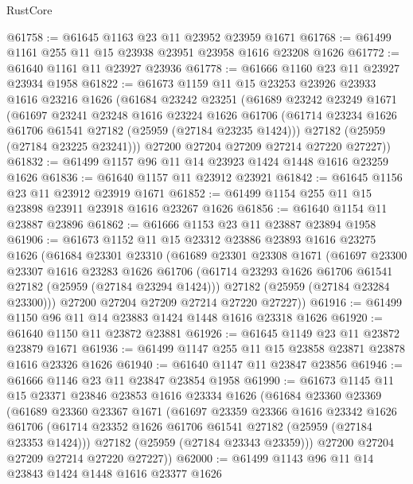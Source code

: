 \begin{lexlean}{RustCore}
\begin{coremodule}
@61758 := @61645 @1163 @23 @11 @23952 @23959 @1671
@61768 := @61499 @1161 @255 @11 @15 @23938 @23951 @23958 @1616 @23208 @1626
@61772 := @61640 @1161 @11 @23927 @23936
@61778 := @61666 @1160 @23 @11 @23927 @23934 @1958
@61822 := @61673
    @1159
    @11
    @15
    @23253
    @23926
    @23933
    @1616
    @23216
    @1626
    (@61684
      @23242
      @23251
      (@61689
        @23242
        @23249
        @1671
        (@61697
          @23241
          @23248
          @1616
          @23224
          @1626
          @61706
          (@61714 @23234 @1626 @61706 @61541 @27182 (@25959 (@27184 @23235 @1424)))
          @27182
          (@25959 (@27184 @23225 @23241)))
        @27200
        @27204
        @27209
        @27214
        @27220
        @27227))
@61832 := @61499 @1157 @96 @11 @14 @23923 @1424 @1448 @1616 @23259 @1626
@61836 := @61640 @1157 @11 @23912 @23921
@61842 := @61645 @1156 @23 @11 @23912 @23919 @1671
@61852 := @61499 @1154 @255 @11 @15 @23898 @23911 @23918 @1616 @23267 @1626
@61856 := @61640 @1154 @11 @23887 @23896
@61862 := @61666 @1153 @23 @11 @23887 @23894 @1958
@61906 := @61673
    @1152
    @11
    @15
    @23312
    @23886
    @23893
    @1616
    @23275
    @1626
    (@61684
      @23301
      @23310
      (@61689
        @23301
        @23308
        @1671
        (@61697
          @23300
          @23307
          @1616
          @23283
          @1626
          @61706
          (@61714 @23293 @1626 @61706 @61541 @27182 (@25959 (@27184 @23294 @1424)))
          @27182
          (@25959 (@27184 @23284 @23300)))
        @27200
        @27204
        @27209
        @27214
        @27220
        @27227))
@61916 := @61499 @1150 @96 @11 @14 @23883 @1424 @1448 @1616 @23318 @1626
@61920 := @61640 @1150 @11 @23872 @23881
@61926 := @61645 @1149 @23 @11 @23872 @23879 @1671
@61936 := @61499 @1147 @255 @11 @15 @23858 @23871 @23878 @1616 @23326 @1626
@61940 := @61640 @1147 @11 @23847 @23856
@61946 := @61666 @1146 @23 @11 @23847 @23854 @1958
@61990 := @61673
    @1145
    @11
    @15
    @23371
    @23846
    @23853
    @1616
    @23334
    @1626
    (@61684
      @23360
      @23369
      (@61689
        @23360
        @23367
        @1671
        (@61697
          @23359
          @23366
          @1616
          @23342
          @1626
          @61706
          (@61714 @23352 @1626 @61706 @61541 @27182 (@25959 (@27184 @23353 @1424)))
          @27182
          (@25959 (@27184 @23343 @23359)))
        @27200
        @27204
        @27209
        @27214
        @27220
        @27227))
@62000 := @61499 @1143 @96 @11 @14 @23843 @1424 @1448 @1616 @23377 @1626

\end{coremodule}
\end{lexlean}
